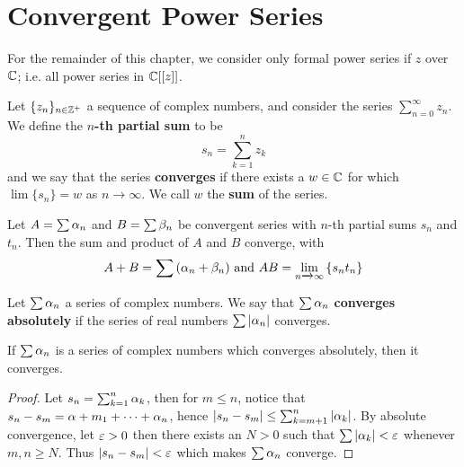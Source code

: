 \section{Convergent Power Series}

For the remainder of this chapter, we consider only formal power series if $z$
over  $\mathbb{C}$; i.e. all power series in  $\mathbb{C}[[z]]$.

\begin{definition}
    Let $\{z_n\}_{n \in \mathbb{Z}^+}$ a sequence of complex numbers, and consider the
    series $\sum_{n=0}^\infty{z_n}$. We define the \textbf{$n$-th partial sum}
    to be
    \begin{equation*}
        s_n=\sum_{k=1}^n{z_k}
    \end{equation*}
    and we say that the series \textbf{converges} if there exists a $w \in \mathbb{C}$
    for which  $\lim{\{s_n\}}=w$ as $n \xrightarrow{} \infty$. We call $w$ the
    \textbf{sum} of the series.
\end{definition}

\begin{lemma}\label{lemma_2.2.1}
    Let $A=\sum{\alpha_n}$ and $B=\sum{\beta_n}$ be convergent series with $n$-th
    partial sums  $s_n$ and  $t_n$. Then the sum and product of  $A$ and  $B$
    converge, with
    \begin{equation*}
        A+B=\sum{(\alpha_n+\beta_n)} \text{ and } AB=\lim_{n \xrightarrow{} \infty}{\{s_nt_n\}}
    \end{equation*}
\end{lemma}

\begin{definition}
    Let $\sum{\alpha_n}$ a series of complex numbers. We say that $\sum{\alpha_n}$
    \textbf{converges absolutely} if the series of real numbers $\sum{|\alpha_n|}$
    converges.
\end{definition}

\begin{lemma}\label{2.2.2}
    If $\sum{\alpha_n}$ is a series of complex numbers which converges absolutely,
    then it converges.
\end{lemma}
\begin{proof}
    Let $s_n=\sum_{k=1}^n{\alpha_k}$, then for $m \leq n$, notice that
    $s_n-s_m=\alpha+{m_1}+\dots+\alpha_n$, hence $|s_n-s_m| \leq
    \sum_{k=m+1}^n{|\alpha_k|}$. By absolute convergence, let $\varepsilon>0$ then there
    exists an  $N>0$ such that  $\sum{|\alpha_k|}<\varepsilon$ whenever $m,n \geq N$. Thus
    $|s_n-s_m|<\varepsilon$ which makes  $\sum{\alpha_n}$ converge.
\end{proof}

